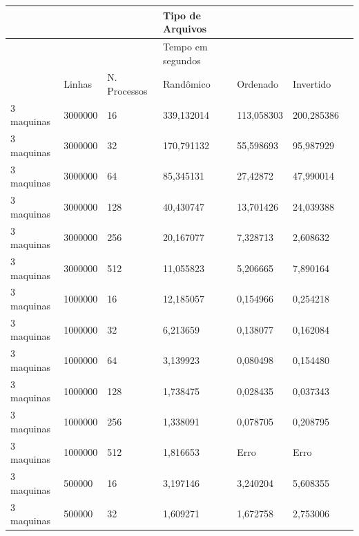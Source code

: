 \documentclass[12pt]{article}
\begin{document}
\begin{table}[]
\begin{tabular}{l|llllll}
           &                 &                     & Tipo de Arquivos  &            &            \\  \hline
           &                 &                     & Tempo em segundos &            &            \\ \hline
        & Linhas     & N. Processos      & Randômico         & Ordenado   & Invertido  \\ \hline
3 maquinas & 3000000    & 16              & 339,132014          & 113,058303        & 200,285386 \\
3 maquinas & 3000000    & 32              & 170,791132          & 55,598693         & 95,987929  &            \\
3 maquinas & 3000000    & 64              & 85,345131           & 27,42872          & 47,990014  &            \\
3 maquinas & 3000000    & 128             & 40,430747           & 13,701426         & 24,039388  &            \\
3 maquinas & 3000000    & 256             & 20,167077           & 7,328713          & 2,608632   &            \\
3 maquinas & 3000000    & 512             & 11,055823           & 5,206665          & 7,890164   &            \\
3 maquinas & 1000000    & 16              & 12,185057           & 0,154966          & 0,254218   &            \\
3 maquinas & 1000000    & 32              & 6,213659            & 0,138077          & 0,162084   &            \\
3 maquinas & 1000000    & 64              & 3,139923            & 0,080498          & 0,154480   &            \\
3 maquinas & 1000000    & 128             & 1,738475            & 0,028435          & 0,037343   &            \\
3 maquinas & 1000000    & 256             & 1,338091            & 0,078705          & 0,208795   &            \\
3 maquinas & 1000000    & 512             & 1,816653            & Erro              & Erro       &            \\
3 maquinas & 500000     & 16              & 3,197146            & 3,240204          & 5,608355   &            \\
3 maquinas & 500000     & 32              & 1,609271            & 1,672758          & 2,753006   &            \\

\end{tabular}
\end{table}
\end{document}
